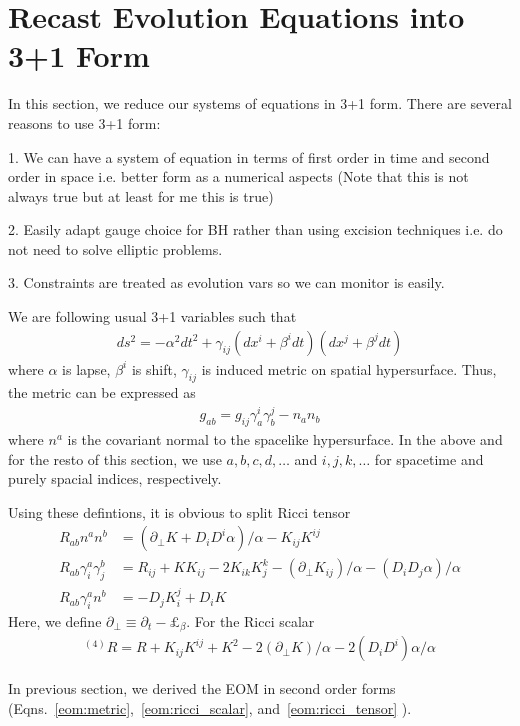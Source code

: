 \documentclass[a4paper,oneside,openany,11pt]{memoir}
\numberwithin{equation}{section} %
\newcommand{\aaron}[1]{{\color{cyan} #1}}
\begin{document}
\section{Recast Evolution Equations into 3+1 Form}

In this section, we reduce our systems of equations in 3+1 form. There are several reasons to use 3+1 form:

1. We can have a system of equation in terms of first order in time and second order in space i.e. better form
as a numerical aspects (Note that this is not always true but at least for me this is true)

2. Easily adapt gauge choice for BH rather than using excision techniques i.e. do not need to solve elliptic problems.

3. Constraints are treated as evolution vars so we can monitor is easily.

We are following usual 3+1 variables such that
\begin{align}
\label{eqn:3p1}
ds^2 = -\alpha^2 dt^2 + \gamma_{ij} (dx^i + \beta^i dt)(dx^j + \beta^j dt)
\end{align}
where $\alpha$ is lapse, $\beta^i$ is shift, $\gamma_{ij}$ is induced metric on spatial hypersurface.
Thus, the metric can be expressed as
\begin{align}
g_{ab} = g_{ij}\gamma^i_a \gamma^j_b - n_a n_b
\end{align}
where $n^a$ is the covariant normal to the spacelike hypersurface. \aaron{In the above and for the resto of this section, we use $a,b,c,d,\dots$ and $i,j,k,\dots$ for spacetime and purely spacial indices, respectively.}

Using these defintions, it is obvious to split Ricci tensor
\begin{align}
\label{ricci3p1}
R_{ab} n^a n^b &= (\partial_\bot K + D_i D^i \alpha)/\alpha - K_{ij} K^{ij} \\
R_{ab} \gamma^a_i \gamma^b_j &= R_{ij} + K K_{ij} - 2 K_{ik} K^{k}_j - (\partial_\bot K_{ij})/\alpha
-(D_i D_j \alpha)/\alpha \\
R_{ab} \gamma^a_i n^b &= - D_j K^j_i + D_i K
\end{align}
Here, we define $\partial_\bot \equiv \partial_t - \pounds_\beta$. For the Ricci scalar
\begin{align}
^{(4)}R = R + K_{ij} K^{ij} + K^2 - 2 (\partial_\bot K) /\alpha - 2 (D_i D^i) \alpha / \alpha
\end{align}

In previous section, we derived the EOM in second order forms 
(Eqns.~\ref{eom:metric},~\ref{eom:ricci_scalar}, and~\ref{eom:ricci_tensor} ).
\end{document}
